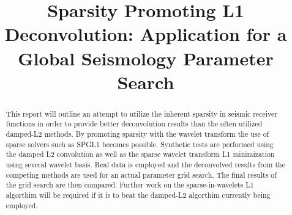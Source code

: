 \documentclass[jgrga]{agutex}
\begin{document}
%
%


\title{Sparsity Promoting L1 Deconvolution: Application for a Global Seismology Parameter Search}
%
%

%
%










%
%


\begin{abstract}
This report will outline an attempt to utilize the inherent sparsity in seismic receiver functions in order to provide better deconvolution results than the often utilized damped-L2 methods. By promoting sparsity with the wavelet transform the use of sparse solvers such as SPGL1 becomes possible. Synthetic tests are performed using the damped L2 convolution as well as the sparse wavelet transform L1 minimization using several wavelet basis. Real data is employed and the deconvolved results from the competing methods are used for an actual parameter grid search. The final results of the grid search are then compared. Further work on the sparse-in-wavelets L1 algorthim will be required if it is to beat the damped-L2 algorthim currently being employed.
\end{abstract}
\end{document}

